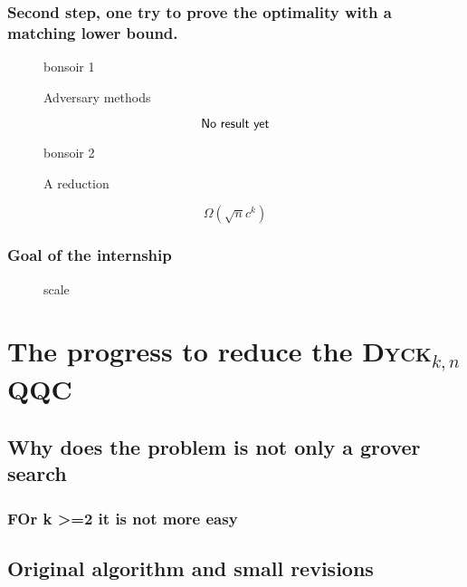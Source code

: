 \documentclass[9pt, notheorems]{beamer}
\newcommand{\Dyck}[1]{\textsc{Dyck$_{#1}$}}
\theoremstyle{definition}
\theoremstyle{plain}
\theoremstyle{definition}
\begin{document}
\begin{frame}
    \frametitle{Second step, one try to prove the optimality with a matching lower bound.}

    \begin{minipage}{.45\textwidth}
        \begin{figure}
            bonsoir 1
            \caption{Adversary methods}
        \end{figure}
        \pause
        {\huge  \[\textrm{\sffamily{No\ result\ yet}}\]}
    \end{minipage}
    \hfill
    \pause
    \begin{minipage}{.45\textwidth}
        \begin{figure}
            bonsoir 2
            \caption{A reduction}
        \end{figure}
        \pause
        {\huge \[\Omega\left(\sqrt{n}c^{k}\right)\]}
    \end{minipage}
\end{frame}

\begin{frame}
    \frametitle{Goal of the internship}
    \begin{figure}
        \caption{scale}
    \end{figure}
\end{frame}




\section{The progress to reduce the \Dyck{k,n} QQC}

\subsection{Why does the problem is not only a grover search }

\begin{frame}
    \frametitle{FOr k >=2 it is not more easy}



\end{frame}

\subsection{Original algorithm and small revisions }
\end{document}
